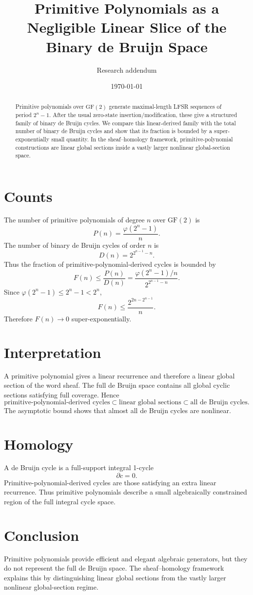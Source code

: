 \documentclass[11pt]{article}
\title{Primitive Polynomials as a Negligible Linear Slice of the Binary de Bruijn Space}
\author{Research addendum}
\date{\today}
\begin{document}
\maketitle

\begin{abstract}
Primitive polynomials over \(\mathrm{GF}(2)\) generate maximal-length LFSR sequences of period \(2^n-1\). After the usual zero-state insertion/modification, these give a structured family of binary de Bruijn cycles. We compare this linear-derived family with the total number of binary de Bruijn cycles and show that its fraction is bounded by a super-exponentially small quantity. In the sheaf--homology framework, primitive-polynomial constructions are linear global sections inside a vastly larger nonlinear global-section space.
\end{abstract}

\section{Counts}

The number of primitive polynomials of degree \(n\) over \(\mathrm{GF}(2)\) is
\[
P(n)=\frac{\varphi(2^n-1)}{n}.
\]
The number of binary de Bruijn cycles of order \(n\) is
\[
D(n)=2^{2^{n-1}-n}.
\]
Thus the fraction of primitive-polynomial-derived cycles is bounded by
\[
F(n)\le \frac{P(n)}{D(n)}
=
\frac{\varphi(2^n-1)/n}{2^{2^{n-1}-n}}.
\]
Since \(\varphi(2^n-1)\le 2^n-1<2^n\),
\[
F(n)\le \frac{2^{2n-2^{n-1}}}{n}.
\]
Therefore \(F(n)\to0\) super-exponentially.

\section{Interpretation}

A primitive polynomial gives a linear recurrence and therefore a linear global section of the word sheaf. The full de Bruijn space contains all global cyclic sections satisfying full coverage. Hence
\[
\text{primitive-polynomial-derived cycles}
\subset
\text{linear global sections}
\subset
\text{all de Bruijn cycles}.
\]
The asymptotic bound shows that almost all de Bruijn cycles are nonlinear.

\section{Homology}

A de Bruijn cycle is a full-support integral 1-cycle
\[
\partial c=0.
\]
Primitive-polynomial-derived cycles are those satisfying an extra linear recurrence. Thus primitive polynomials describe a small algebraically constrained region of the full integral cycle space.

\section{Conclusion}

Primitive polynomials provide efficient and elegant algebraic generators, but they do not represent the full de Bruijn space. The sheaf--homology framework explains this by distinguishing linear global sections from the vastly larger nonlinear global-section regime.
\end{document}
